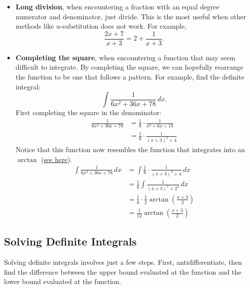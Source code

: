 \documentclass[12pt]{article}
\begin{document}
                \begin{itemize}
                    \item \textbf{Long division}, when encountering a fraction with an equal degree numerator and denominator, just divide. This is the most useful when other methods like u-substitution does not work. For example,
                    \[ \frac{2x+7}{x+3} = 2 + \frac{1}{x+3}. \]

                    \item \textbf{Completing the square}, when encountering a function that may seem difficult to integrate. By completing the square, we can hopefully rearrange the function to be one that follows a pattern. For example, find the definite integral:
                    \[ \int \frac{1}{6x^2+36x+78} \, dx. \]
                    First completing the square in the denominator:
                    \begin{align*}
                        \frac{1}{6x^2+36x+78} &= \frac{1}{6} \cdot \frac{1}{x^2+6x+13} \\[6pt]
                        &= \frac{1}{6} \cdot \frac{1}{(x+3)^2 + 4}
                    \end{align*}
                    Notice that this function now resembles the function that integrates into an $\arctan$ (\hyperref[sec:arctanintegral]{see here}).
                    \begin{align*}
                        \int \frac{1}{6x^2+36x+78} \, dx &= \int \frac{1}{6} \cdot \frac{1}{(x+3)^2 + 4} \, dx \\[6pt]
                        &= \frac{1}{6} \int \frac{1}{(x+3)^2 + 2^2} \, dx\\[6pt]
                        &= \frac{1}{6} \cdot \frac{1}{2} \arctan \left( \frac{x+3}{2} \right) \\[6pt]
                        &= \frac{1}{12} \arctan \left( \frac{x+3}{2} \right)
                    \end{align*}
                \end{itemize}

        \subsection{Solving Definite Integrals}
            Solving definite integrals involves just a few steps. First, antidifferentiate, then find the difference between the upper bound evaluated at the function and the lower bound evaluated at the function.
\end{document}
